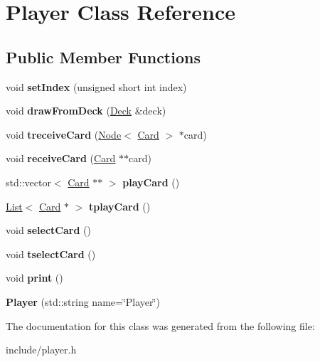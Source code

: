 \hypertarget{class_player}{}\section{Player Class Reference}
\label{class_player}
\subsection*{Public Member Functions}
\begin{DoxyCompactItemize}
\item 
\mbox{\label{class_player_a5a75a83f844cc42de19a36ebcafdba7f}} 
void {\bfseries set\+Index} (unsigned short int index)
\item 
\mbox{\label{class_player_a09eba76a9625117574c1d854d961c1e7}} 
void {\bfseries draw\+From\+Deck} (\hyperlink{class_deck}{Deck} \&deck)
\item 
\mbox{\label{class_player_a2d6862603dd19998b53a93a17d917277}} 
void {\bfseries treceive\+Card} (\hyperlink{struct_node}{Node}$<$ \hyperlink{class_card}{Card} $>$ $\ast$card)
\item 
\mbox{\label{class_player_a893031432d4bc4212d7f26f9fcef11b8}} 
void {\bfseries receive\+Card} (\hyperlink{class_card}{Card} $\ast$$\ast$card)
\item 
\mbox{\label{class_player_af53c36cc58b266ba4e3b670bdaa74012}} 
std\+::vector$<$ \hyperlink{class_card}{Card} $\ast$$\ast$ $>$ {\bfseries play\+Card} ()
\item 
\mbox{\label{class_player_ad8ffb6448467c473d9a9245441a31b4c}} 
\hyperlink{class_list}{List}$<$ \hyperlink{class_card}{Card} $\ast$ $>$ {\bfseries tplay\+Card} ()
\item 
\mbox{\label{class_player_a9dd9d52224198075401c245828ca9e51}} 
void {\bfseries select\+Card} ()
\item 
\mbox{\label{class_player_a3e3cb450db73886dba2ee6c448e22493}} 
void {\bfseries tselect\+Card} ()
\item 
\mbox{\label{class_player_ae298148cd8152bbe1d2e237e76621ce2}} 
void {\bfseries print} ()
\item 
\mbox{\label{class_player_ac6f239e98158f2324a0bf4cedcc921ba}} 
{\bfseries Player} (std\+::string name=\char`\"{}Player\char`\"{})
\end{DoxyCompactItemize}


The documentation for this class was generated from the following file\+:\begin{DoxyCompactItemize}
\item 
include/player.\+h\end{DoxyCompactItemize}
